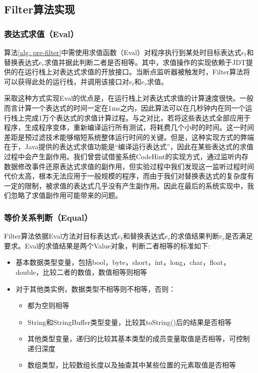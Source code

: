 \subsection{Filter算法实现}

\subsubsection{表达式求值（Eval）}
算法\ref{alg: pre-filter}中需使用求值函数（Eval）对程序执行到某处时目标表达式$e_t$和替换表达式$e_r$求值并据此判断二者是否相等。其中，求值操作的实现依赖于JDT提供的在运行栈上对表达式求值的开放接口。当断点监听器被触发时，Filter算法将可以获得此处的运行栈，并调用该接口对$e_t$和$e_r$求值。

采取这种方式实现Eval的优点是，在运行栈上对表达式求值的计算速度很快。一般而言计算一个表达式的时间一定在1ms之内，因此算法可以在几秒钟内在同一个运行栈上完成1万个表达式的求值计算过程。与之对比，若将这些表达式全部应用于程序，生成程序变体，重新编译运行所有测试，将耗费几个小时的时间。这一时间差距是预过滤技术能够缩短系统整体运行时间的关键。但是，这种实现方式的弊端在于，Java提供的表达式求值功能是“编译运行表达式”，因此在某些表达式的求值过程中会产生副作用。我们曾尝试借鉴系统CodeHint\cite{Galenson:2014:CDI:2568225.2568250}的实现方式，通过监听内存数据修改事件还原表达式求值的副作用，但实验过程中我们发现这一监听过程时间代价太高，根本无法应用于一般规模的程序，而由于我们对替换表达式的复杂度有一定的限制，被求值的表达式几乎没有产生副作用。因此在最后的系统实现中，我们忽略了求值副作用可能带来的问题。


\subsubsection{等价关系判断（Equal）}
Filter算法依据Eval方法对目标表达式$e_t$和替换表达式$e_r$的求值结果判断$e_r$是否满足要求。Eval的求值结果是两个Value对象，判断二者相等的标准如下:
\begin{itemize}
	\item 基本数据类型变量，包括bool，byte，short，int，long，char，float，double，比较二者的数值，数值相等则相等
	\item 对于其他类实例，数据类型不相等则不相等，否则：
	\begin{itemize}
		\item 都为空则相等
		\item String和StringBuffer类型变量，比较其toString()后的结果是否相等
		\item 其他类型变量，递归的比较其基本类型的成员变量取值是否相等，可控制递归深度
		\item 数组类型，比较数组长度以及抽查其中某些位置的元素取值是否相等
	\end{itemize}
\end{itemize}


